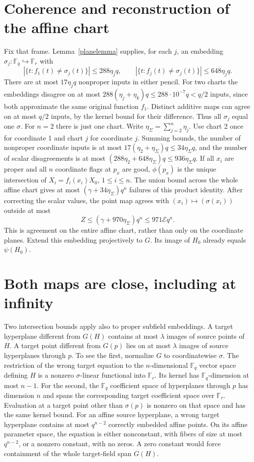 \documentclass[11pt]{article}
\newcommand{\F}{\mathbb F}
\begin{document}
\section{Coherence and reconstruction of the affine chart}\label{coherence}
Fix that frame. Lemma~\ref{planelemma} supplies, for each $j$, an
embedding $\sigma_j:\F_q\hookrightarrow\F_r$ with
\[
 |\{t:f_1(t)\ne\sigma_j(t)\}|\leq288\eta_jq,\qquad
 |\{t:f_j(t)\ne\sigma_j(t)\}|\leq648\eta_jq.
\]
There are at most $17\eta_jq$ nonproper inputs in either pencil.
For two charts the embeddings disagree on at most
$288(\eta_j+\eta_k)q\leq288\cdot10^{-7}q<q/2$ inputs, since both
approximate the same original function $f_1$. Distinct additive maps
can agree on at most $q/2$ inputs, by the kernel bound for their
difference. Thus all $\sigma_j$ equal one $\sigma$. For $n=2$ there
is just one chart.
Write $\eta_\Sigma=\sum_{j=2}^n\eta_j$. Use chart 2 once for coordinate
1 and chart $j$ for coordinate $j$. Summing bounds, the number of
nonproper coordinate inputs is at most
$17(\eta_2+\eta_\Sigma)q\leq34\eta_\Sigma q$, and the number of
scalar disagreements is at most
$(288\eta_2+648\eta_\Sigma)q\leq936\eta_\Sigma q$.
If all $x_i$ are proper and all $n$ coordinate flags at $p_x$ are good,
$\phi(p_x)$ is the unique intersection of
$X_i=f_i(x_i)X_0$, $1\leq i\leq n$. The union bound across the whole
affine chart gives at most $(\gamma+34\eta_\Sigma)q^n$ failures of
this product identity. After correcting the scalar values, the point
map agrees with $(x_i)\mapsto(\sigma(x_i))$ outside at most
\begin{equation}\label{affine}
 Z\leq(\gamma+970\eta_\Sigma)q^n\leq971\mathcal E q^n.
\end{equation}
This is agreement on the entire affine chart, rather than only on the
coordinate planes. Extend this embedding projectively to $G$. Its
image of $H_0$ already equals $\psi(H_0)$.

\section{Both maps are close, including at infinity}\label{infinity}
Two intersection bounds apply also to proper subfield embeddings.
A target hyperplane different from $G(H)$ contains at most $\lambda$
images of source points of $H$. A target point different from $G(p)$
lies on at most $\lambda$ images of source hyperplanes through $p$.
To see the first, normalize $G$ to coordinatewise $\sigma$. The
restriction of the wrong target equation to the $n$-dimensional
$\F_q$ vector space defining $H$ is a nonzero $\sigma$-linear
functional into $\F_r$. Its kernel has $\F_q$-dimension at most $n-1$.
For the second, the $\F_q$ coefficient space of hyperplanes through
$p$ has dimension $n$ and spans the corresponding target coefficient
space over $\F_r$. Evaluation at a target point other than $\sigma(p)$
is nonzero on that space and has the same kernel bound.
For an affine source hyperplane, a wrong target hyperplane contains
at most $q^{n-2}$ correctly embedded affine points. On its affine
parameter space, the equation is either nonconstant, with fibers of
size at most $q^{n-2}$, or a nonzero constant, with no zeros. A zero
constant would force containment of the whole target-field span $G(H)$.
\end{document}
